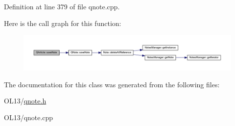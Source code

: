 Definition at line 379 of file qnote.\+cpp.

Here is the call graph for this function\+:\nopagebreak
\begin{figure}[H]
\begin{center}
\leavevmode
\includegraphics[width=350pt]{class_q_article_ae59d03688947d16b86f9ab10384894ec_cgraph}
\end{center}
\end{figure}


The documentation for this class was generated from the following files\+:\begin{DoxyCompactItemize}
\item 
O\+L13/\hyperlink{qnote_8h}{qnote.\+h}\item 
O\+L13/qnote.\+cpp\end{DoxyCompactItemize}
